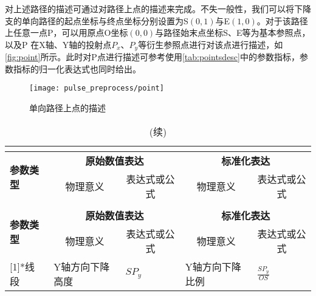 对上述路径的描述可通过对路径上点的描述来完成。不失一般性，我们可以将下降支的单向路径的起点坐标与终点坐标分别设置为S$(0,1)$与E$(1,0)$。对于该路径上任意一点P，可以用原点O坐标$(0,0)$与路径始末点坐标S、E等为基本参照点，以及P
在X轴、Y轴的投射点$P_x$、$P_y$等衍生参照点进行对该点进行描述，如\autoref{fig:point}所示。此时对P点进行描述可参考使用\autoref{tab:pointsdesc}中的参数指标，参数指标的归一化表达式也同时给出。
\begin{figure}[htbp]
    \centering
    \texttt{[image: pulse\_preprocess/point]}
    \caption{\label{fig:point}单向路径上点的描述}
\end{figure}
\begin{center}
    \fontsize{10}{4}
    \begin{longtable}{m{1.57cm}<{\centering}m{4.07cm}<{\centering}m{2.07cm}<{\centering}m{4.07cm}<{\centering}m{2.07cm}<{\centering}}
		\caption{单向路径上任意一点的描述指标一览}\\
		\label{tab:pointsdesc}\\
		\hline\hline
        \multirow{2}[2]{*}{\textbf{参数类型}} & \multicolumn{2}{c}{\textbf{原始数值表达}} & \multicolumn{2}{c}{\textbf{标准化表达}} \\
            & \multicolumn{1}{c}{物理意义} & \multicolumn{1}{c}{表达式或公式} & \multicolumn{1}{c}{物理意义} & \multicolumn{1}{c}{表达式或公式} \\
        \hline
        \endfirsthead
        \caption[]{(续)}\\
        \hline
        \multirow{2}[2]{*}{\textbf{参数类型}} & \multicolumn{2}{c}{\textbf{原始数值表达}} & \multicolumn{2}{c}{\textbf{标准化表达}} \\
            & \multicolumn{1}{c}{物理意义} & \multicolumn{1}{c}{表达式或公式} & \multicolumn{1}{c}{物理意义} & \multicolumn{1}{c}{表达式或公式} \\
        \hline
        \endhead 
        \hline
        \endfoot
        \hline\hline
        \endlastfoot
        \multirow{7}[1]{*}{线段}    & Y轴方向下降高度           &   $SP_y$      &  Y轴方向下降比例     & $\frac{SP_y}{OS}$ \\

\end{longtable}
\end{center}

